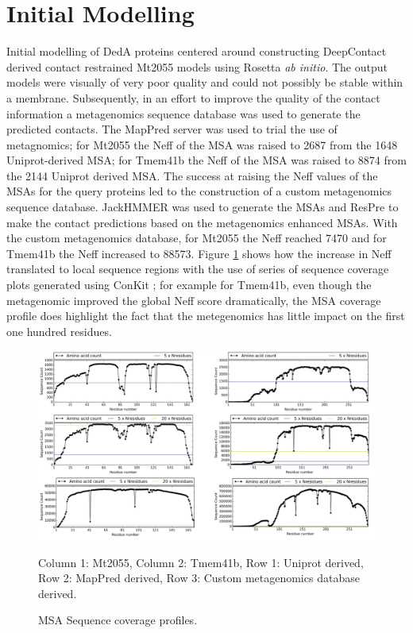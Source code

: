 \section{Initial Modelling}
Initial modelling of DedA proteins centered around constructing DeepContact \cite{Liu2018} derived contact restrained Mt2055 models using Rosetta \emph{ab initio}.  The output models were visually of very poor quality and could not possibly be stable within a membrane.  Subsequently, in an effort to improve the quality of the contact information a metagenomics \cite{Ovchinnikov2017} sequence database was used to generate the predicted contacts.  The MapPred \cite{wu2020protein} server was used to trial the use of metagnomics; for Mt2055 the Neff of the MSA was raised to 2687 from the  1648 Uniprot-derived MSA; for Tmem41b the Neff of the MSA was raised to 8874 from the 2144 Uniprot derived MSA.  The success at raising the Neff values of the MSAs for the query proteins led to the construction of a custom metagenomics sequence database. JackHMMER \cite{Johnson2010} was used to generate the MSAs and ResPre \cite{Li} to make the contact predictions based on the metagenomics enhanced MSAs.  With the custom metagenomics database, for Mt2055 the Neff reached 7470 and for Tmem41b the Neff increased to 88573.  Figure \ref{fig:seq_coverage} shows how the increase in Neff translated to local sequence regions  with the use of series of sequence coverage plots generated using ConKit \cite{conkit2017}; for example for Tmem41b, even though the metagenomic improved the global Neff score dramatically, the MSA coverage profile does highlight the fact that the metegenomics has little impact on the first one hundred residues.

\begin{figure}[th!]
    \makebox[\textwidth]{\texttt{[image: ...]}}
    \includegraphics[width=\textwidth]{Results/meta_fig.png}
    \caption{MSA Sequence coverage profiles.}
    \label{fig:seq_coverage}
    \small
    Column 1: Mt2055, Column 2: Tmem41b, Row 1: Uniprot derived, Row 2: MapPred derived, Row 3: Custom metagenomics database derived.
\end{figure}

